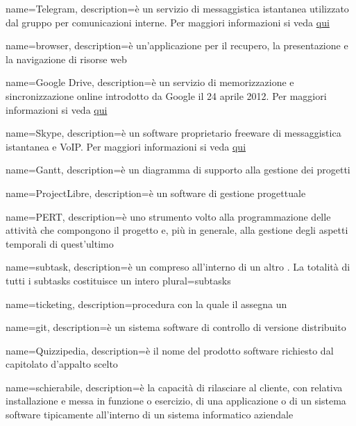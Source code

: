  {
	name=Telegram,
	description={è un servizio di messaggistica istantanea utilizzato dal gruppo per comunicazioni interne. Per maggiori informazioni si veda \href{https://it.wikipedia.org/wiki/Telegram_(software)}{qui}}
}

 {
	name=browser,
	description={è un'applicazione per il recupero, la presentazione e la navigazione di risorse web}
}

 {
	name=Google Drive,
	description={è un servizio di memorizzazione e sincronizzazione online introdotto da Google il 24 aprile 2012. Per maggiori informazioni si veda \href{https://it.wikipedia.org/wiki/Google_Drive}{qui}}
}

 {
	name=Skype,
	description={è un software proprietario freeware di messaggistica istantanea e VoIP. Per maggiori informazioni si veda \href{https://it.wikipedia.org/wiki/Skype}{qui}}
}

 {
	name=Gantt,
	description={è un diagramma di supporto alla gestione dei progetti}
}

 {
	name=ProjectLibre,
	description={è un software di gestione progettuale}
}

 {
	name=PERT,
	description={è uno strumento volto alla programmazione delle attività che compongono il progetto e, più in generale, alla gestione degli aspetti temporali di quest'ultimo}
}

 {
	name=subtask,
	description={è un  compreso all'interno di un altro . La totalità di tutti i subtasks costituisce un intero }
	plural=subtasks
}

 {
	name=ticketing,
	description={procedura con la quale il \RE assegna un }
}

 {
	name=git,
	description={è un sistema software di controllo di versione distribuito}
}

 {
	name=Quizzipedia,
	description={è il nome del prodotto software richiesto dal capitolato d'appalto scelto}
}

 {
	name=schierabile,
	description={è la capacità di rilasciare al cliente, con relativa installazione e messa in funzione o esercizio, di una applicazione o di un sistema software tipicamente all'interno di un sistema informatico aziendale}
}

